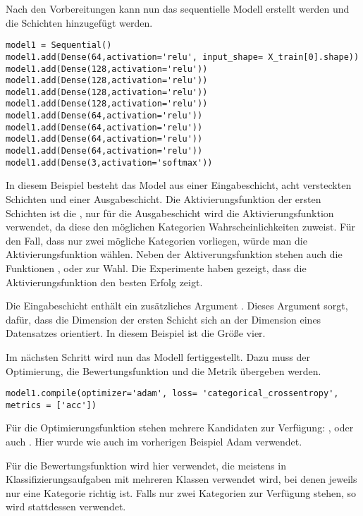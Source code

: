 Nach den Vorbereitungen kann nun das sequentielle Modell erstellt werden und die Schichten hinzugefügt werden.

\begin{verbatim}
model1 = Sequential()
model1.add(Dense(64,activation='relu', input_shape= X_train[0].shape))
model1.add(Dense(128,activation='relu'))
model1.add(Dense(128,activation='relu'))
model1.add(Dense(128,activation='relu'))
model1.add(Dense(128,activation='relu'))
model1.add(Dense(64,activation='relu'))
model1.add(Dense(64,activation='relu'))
model1.add(Dense(64,activation='relu'))
model1.add(Dense(64,activation='relu'))
model1.add(Dense(3,activation='softmax'))
\end{verbatim}

In diesem Beispiel
besteht das Model aus einer Eingabeschicht, acht versteckten Schichten und einer 
Ausgabeschicht. Die Aktivierungsfunktion der ersten Schichten ist die , nur für die Ausgabeschicht
wird die Aktivierungsfunktion  verwendet, da diese den möglichen Kategorien Wahrscheinlichkeiten
zuweist. Für den Fall, dass nur zwei mögliche Kategorien vorliegen, würde man die Aktivierungsfunktion
 wählen. Neben der Aktiverungsfunktion  stehen auch die Funktionen , 
oder  zur Wahl. Die Experimente haben gezeigt, dass die Aktivierungsfunktion 
den besten Erfolg zeigt.

Die Eingabeschicht enthält ein zusätzliches Argument . Dieses Argument sorgt, dafür, dass die
Dimension der ersten Schicht sich an der Dimension eines Datensatzes orientiert. In diesem Beispiel
ist die Größe vier.

Im nächsten Schritt wird nun das Modell fertiggestellt. Dazu muss der Optimierung, die Bewertungsfunktion und die Metrik übergeben werden.

\begin{verbatim}
model1.compile(optimizer='adam', loss= 'categorical_crossentropy', metrics = ['acc'])
\end{verbatim}

Für die Optimierungsfunktion stehen mehrere Kandidaten zur Verfügung:
,  oder auch . Hier wurde
wie auch im vorherigen Beispiel Adam verwendet.

Für die Bewertungsfunktion wird hier  verwendet, die meistens in 
Klassifizierungsaufgaben mit mehreren Klassen verwendet wird, bei denen jeweils nur eine Kategorie richtig ist. 
Falls nur zwei
Kategorien zur Verfügung stehen, so wird stattdessen  verwendet.

